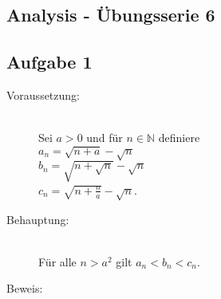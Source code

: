\documentclass[10pt, a4paper]{article}
\begin{document}
	
	\begin{center}\section*{Analysis - Übungsserie 6}\end{center} %
	\label{sec:1}
	
	\subsection*{Aufgabe 1} %
	\label{sub:aufgabe_1}
	
		\begin{description}
			\item[Voraussetzung:] \hfill \\
				Sei $a > 0$ und für $n\in \mathbb{N}$ definiere \\
				$a_n= \sqrt{n+a}-\sqrt{n}$ \\
				$b_n= \sqrt{n+\sqrt{n}}-\sqrt{n}$ \\
				$c_n= \sqrt{n+\frac{n}{a}}-\sqrt{n}$.
			\item[Behauptung:] \hfill \\
				Für alle $n > a^2$ gilt $a_n<b_n<c_n$.
			\item[Beweis:]
		\end{description}
		
\end{document}
